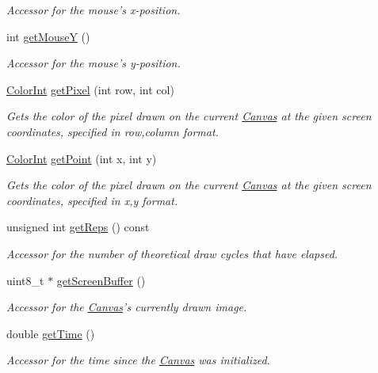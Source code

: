 \begin{DoxyCompactItemize}
\begin{DoxyCompactList}\small\item\em Accessor for the mouse's x-\/position. \end{DoxyCompactList}\item 
int \hyperlink{classtsgl_1_1_canvas_a7fc8592848aaa14c3ff440d0ed3c9e4f}{get\-Mouse\-Y} ()
\begin{DoxyCompactList}\small\item\em Accessor for the mouse's y-\/position. \end{DoxyCompactList}\item 
\hyperlink{structtsgl_1_1_color_int}{Color\-Int} \hyperlink{classtsgl_1_1_canvas_a1f54dba4b09d248e2611f3409353c2c6}{get\-Pixel} (int row, int col)
\begin{DoxyCompactList}\small\item\em Gets the color of the pixel drawn on the current \hyperlink{classtsgl_1_1_canvas}{Canvas} at the given screen coordinates, specified in row,column format. \end{DoxyCompactList}\item 
\hyperlink{structtsgl_1_1_color_int}{Color\-Int} \hyperlink{classtsgl_1_1_canvas_aa31883b3c9b09006cf82b270ad7a0a9f}{get\-Point} (int x, int y)
\begin{DoxyCompactList}\small\item\em Gets the color of the pixel drawn on the current \hyperlink{classtsgl_1_1_canvas}{Canvas} at the given screen coordinates, specified in x,y format. \end{DoxyCompactList}\item 
unsigned int \hyperlink{classtsgl_1_1_canvas_a8f0819f368b41b147f1a7f560a7af6a4}{get\-Reps} () const 
\begin{DoxyCompactList}\small\item\em Accessor for the number of theoretical draw cycles that have elapsed. \end{DoxyCompactList}\item 
uint8\-\_\-t $\ast$ \hyperlink{classtsgl_1_1_canvas_a71f072dd82ca3b5cecfd65cde6d8a226}{get\-Screen\-Buffer} ()
\begin{DoxyCompactList}\small\item\em Accessor for the \hyperlink{classtsgl_1_1_canvas}{Canvas}'s currently drawn image. \end{DoxyCompactList}\item 
double \hyperlink{classtsgl_1_1_canvas_aef462ab48e59571b9c88076bbdc8f0b3}{get\-Time} ()
\begin{DoxyCompactList}\small\item\em Accessor for the time since the \hyperlink{classtsgl_1_1_canvas}{Canvas} was initialized. \end{DoxyCompactList}\item 

\end{DoxyCompactItemize}
